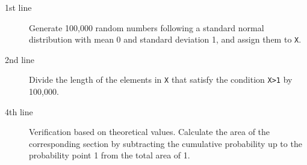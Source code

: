 \begin{description}
	\item[1st line] Generate 100,000 random numbers following a standard normal distribution with mean 0 and standard deviation 1, and assign them to \texttt{X}.
	\item[2nd line] Divide the length of the elements in \texttt{X} that satisfy the condition \texttt{X>1} by 100,000.
	\item[4th line] Verification based on theoretical values. Calculate the area of the corresponding section by subtracting the cumulative probability up to the probability point 1 from the total area of 1.
\end{description}
